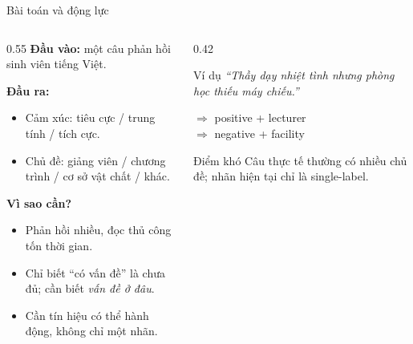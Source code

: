 \documentclass[aspectratio=169,11pt]{beamer}
\begin{document}
\begin{frame}{Bài toán và động lực}
\begin{columns}[T]
\begin{column}{0.55\textwidth}
\textbf{Đầu vào:} một câu phản hồi sinh viên tiếng Việt.

\vspace{0.25cm}
\textbf{Đầu ra:}
\begin{itemize}
  \item Cảm xúc: tiêu cực / trung tính / tích cực.
  \item Chủ đề: giảng viên / chương trình / cơ sở vật chất / khác.
\end{itemize}

\vspace{0.25cm}
\textbf{Vì sao cần?}
\begin{itemize}
  \item Phản hồi nhiều, đọc thủ công tốn thời gian.
  \item Chỉ biết ``có vấn đề'' là chưa đủ; cần biết \emph{vấn đề ở đâu}.
  \item Cần tín hiệu có thể hành động, không chỉ một nhãn.
\end{itemize}
\end{column}
\begin{column}{0.42\textwidth}
\begin{block}{Ví dụ}
\textit{``Thầy dạy nhiệt tình nhưng phòng học thiếu máy chiếu.''}

\vspace{0.2cm}
$\Rightarrow$ positive + lecturer\\
$\Rightarrow$ negative + facility
\end{block}

\vspace{0.2cm}
\begin{alertblock}{Điểm khó}
Câu thực tế thường có nhiều chủ đề; nhãn hiện tại chỉ là single-label.
\end{alertblock}
\end{column}
\end{columns}
\end{frame}
\end{document}
